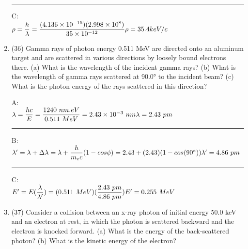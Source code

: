 \documentclass[fleqn]{article}
\begin{document}
\begin{enumerate}
      \textcolor{hwColor}{   
        \rule{15cm}{0.4pt}   
      }

      \textcolor{hwColor}{
        C: \\
        $
          \rho=\dfrac{h}{\lambda}=\dfrac{(4.136 \times 10^{-15})(2.998 \times 10^8)}{35 \times 10^{-12}} \\
          \\
          \rho=35.4 keV/c
        $
      }

    \item (36) Gamma rays of photon energy 0.511 MeV are directed onto
    an aluminum target and are scattered in various directions by
    loosely bound electrons there. (a) What is the wavelength of the incident gamma rays? (b) What is the wavelength of gamma rays
    scattered at 90.0° to the incident beam? (c) What is the photon energy of the rays scattered in this direction?

      \textcolor{hwColor}{
        A: \\
        $
          \lambda=\dfrac{hc}{E}=\dfrac{1240 ~ nm.eV}{0.511 ~ MeV}=2.43 \times 10^{-3} ~ nm \\
          \\
          \lambda=2.43 ~ pm
        $
      }

      \textcolor{hwColor}{   
        \rule{15cm}{0.4pt}   
      }

      \textcolor{hwColor}{
        B: \\
        $
          \lambda^\prime=\lambda+\Delta \lambda=\lambda+\dfrac{h}{m_ec}(1-cos \phi)=2.43+(2.43)(1-cos(90^{\circ})) \\
          \\
          \lambda^\prime=4.86 ~ pm
        $
      }

      \textcolor{hwColor}{   
        \rule{15cm}{0.4pt}   
      }

      \textcolor{hwColor}{
        C: \\
        $
          E^\prime=E(\dfrac{\lambda}{\lambda^\prime})=(0.511 ~ MeV)(\dfrac{2.43 ~ pm}{4.86 ~ pm}) \\
          \\
          E^\prime=0.255 ~ MeV
        $
      }

    \item (37) Consider a collision between an x-ray photon of initial energy 50.0 keV and an electron at rest, in which the photon is scattered backward and the electron is knocked forward. (a) What is
    the energy of the back-scattered photon? (b) What is the kinetic
    energy of the electron?


\end{enumerate}
\end{document}
